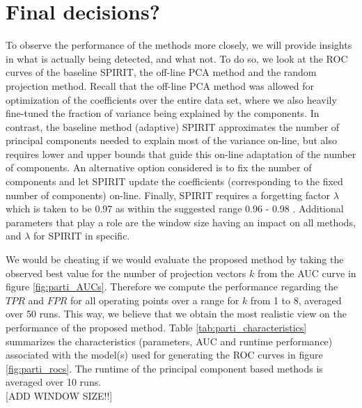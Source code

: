 

\section{Final decisions?}

To observe the performance of the methods more closely, we will provide insights in what is actually being detected, and what not. To do so, we look at the ROC curves of the baseline SPIRIT, the off-line PCA method and the random projection method. Recall that the off-line PCA method was allowed for optimization of the coefficients over the entire data set, where we also heavily fine-tuned the fraction of variance being explained by the components. In contrast, the baseline method (adaptive) SPIRIT approximates the number of principal components needed to explain most of the variance on-line, but also requires lower and upper bounds that guide this on-line adaptation of the number of components. An alternative option considered is to fix the number of components and let SPIRIT update the coefficients (corresponding to the fixed number of components) on-line. Finally, SPIRIT requires a forgetting factor $\lambda$ which is taken to be 0.97 as within the suggested range 0.96 - 0.98 \cite{papadimitriou2005streaming}. Additional parameters that play a role are the window size having an impact on all methods, and $\lambda$ for SPIRIT in specific. 

We would be cheating if we would evaluate the proposed method by taking the observed best value for the number of projection vectors $k$ from the AUC curve in figure \ref{fig:parti_AUCs}. Therefore we compute the performance regarding the $TPR$ and $FPR$ for all operating points over a range for $k$ from 1 to 8, averaged over 50 runs. This way, we believe that we obtain the most realistic view on the performance of the proposed method. Table \ref{tab:parti_characteristics} summarizes the characteristics (parameters, AUC and runtime performance) associated with the model(s) used for generating the ROC curves in figure \ref{fig:parti_rocs}. The runtime of the principal component based methods is averaged over 10 runs.\\

[ADD WINDOW SIZE!!]\\

